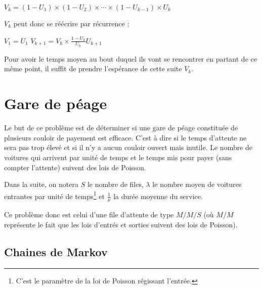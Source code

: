 \documentclass{scrartcl}
\begin{document}
      $V_k = (1 - U_1) \times (1 - U_2) \times \cdots \times (1 - U_{k - 1})
      \times U_k$

      $V_k$ peut donc se réécrire par récurrence :

      $V_1 = U_1$ $V_{k + 1} = V_k \times \frac{1 - U_k}{U_k}U_{k + 1}$

      Pour avoir le temps moyen au bout duquel ils vont se rencontrer en
      partant de ce même point, il suffit de prendre l'espérance de cette suite
      $V_k$.

\section{Gare de péage}
  Le but de ce problème est de déterminer si une gare de péage constituée de
  plusieurs couloir de payement est efficace. C'est à dire si le temps
  d'attente ne sera pas trop élevé et si il n'y a aucun couloir ouvert mais
  inutile. Le nombre de voitures qui arrivent par unité de temps et le temps
  mis pour payer (sans compter l'attente) suivent des lois de Poisson.

  Dans la suite, on notera $S$ le nombre de files, $\lambda$ le nombre moyen de
  voitures entrantes par unité de temps\footnote{C'est le paramètre de la loi
  de Poisson régissant l'entrée.} et $\frac 1 \mu$ la durée moyenne du service.

  Ce problème donc est celui d'une file d'attente de type $M/M/S$ (où $M/M$
  représente le fait que les lois d'entrés et sorties suivent des lois de
  Poisson).

  \subsection{Chaines de Markov}
    
  
\end{document}
